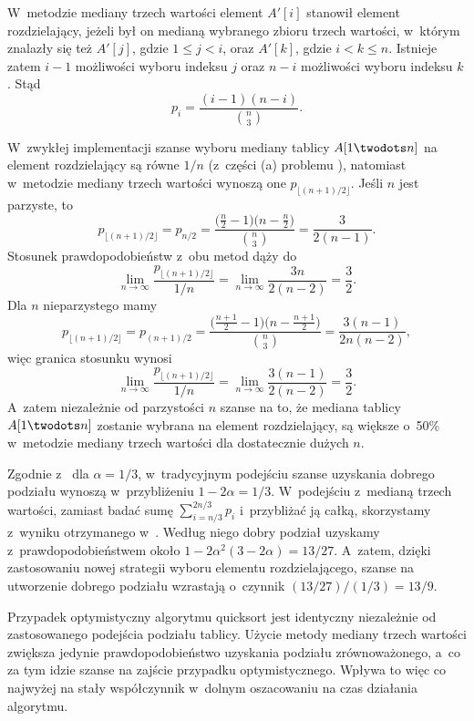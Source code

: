 
\subproblem %
W~metodzie mediany trzech wartości element $A'[i]$ stanowił element rozdzielający, jeżeli był on medianą wybranego zbioru trzech wartości, w~którym znalazły się też $A'[j]$, gdzie $1\le j<i$, oraz $A'[k]$, gdzie $i<k\le n$.
Istnieje zatem $i-1$ możliwości wyboru indeksu $j$ oraz $n-i$ możliwości wyboru indeksu $k$.
Stąd
\[
	p_i = \frac{(i-1)(n-i)}{\binom{n}{3}}.
\]

\subproblem %
W~zwykłej implementacji szanse wyboru mediany tablicy $A[1\twodots n]$ na element rozdzielający są równe $1/n$ (z~części (a) problemu ), natomiast w~metodzie mediany trzech wartości wynoszą one $p_{\lfloor(n+1)/2\rfloor}$.
Jeśli $n$ jest parzyste, to
\[
	p_{\lfloor(n+1)/2\rfloor} = p_{n/2} = \frac{\bigl(\frac{n}{2}-1\bigr)\bigl(n-\frac{n}{2}\bigr)}{\binom{n}{3}} = \frac{3}{2(n-1)}.
\]
Stosunek prawdopodobieństw z~obu metod dąży do
\[
    \lim_{n\to\infty}\frac{p_{\lfloor(n+1)/2\rfloor}}{1/n} = \lim_{n\to\infty}\frac{3n}{2(n-2)} = \frac{3}{2}.
\]
Dla $n$ nieparzystego mamy
\[
	p_{\lfloor(n+1)/2\rfloor} = p_{(n+1)/2} = \frac{\bigl(\frac{n+1}{2}-1\bigr)\bigl(n-\frac{n+1}{2}\bigr)}{\binom{n}{3}} = \frac{3(n-1)}{2n(n-2)},
\]
więc granica stosunku wynosi
\[
    \lim_{n\to\infty}\frac{p_{\lfloor(n+1)/2\rfloor}}{1/n} = \lim_{n\to\infty}\frac{3(n-1)}{2(n-2)} = \frac{3}{2}.
\]
A~zatem niezależnie od parzystości $n$ szanse na to, że mediana tablicy $A[1\twodots n]$ zostanie wybrana na element rozdzielający, są większe o~50\% w~metodzie mediany trzech wartości dla dostatecznie dużych $n$.

\subproblem %
Zgodnie z~ dla $\alpha=1/3$, w~tradycyjnym podejściu szanse uzyskania dobrego podziału wynoszą w~przybliżeniu $1-2\alpha=1/3$.
W~podejściu z~medianą trzech wartości, zamiast badać sumę $\sum_{i=n/3}^{2n/3}p_i$ i~przybliżać ją całką, skorzystamy z~wyniku otrzymanego w~.
Według niego dobry podział uzyskamy z~prawdopodobieństwem około $1-2\alpha^2(3-2\alpha)=13/27$.
A~zatem, dzięki zastosowaniu nowej strategii wyboru elementu rozdzielającego, szanse na utworzenie dobrego podziału wzrastają o~czynnik $(13/27)/(1/3)=13/9$.

\subproblem %
Przypadek optymistyczny algorytmu quicksort jest identyczny niezależnie od zastosowanego podejścia podziału tablicy.
Użycie metody mediany trzech wartości zwiększa jedynie prawdopodobieństwo uzyskania podziału zrównoważonego, a~co za tym idzie szanse na zajście przypadku optymistycznego.
Wpływa to więc co najwyżej na stały współczynnik w~dolnym oszacowaniu na czas działania algorytmu.
